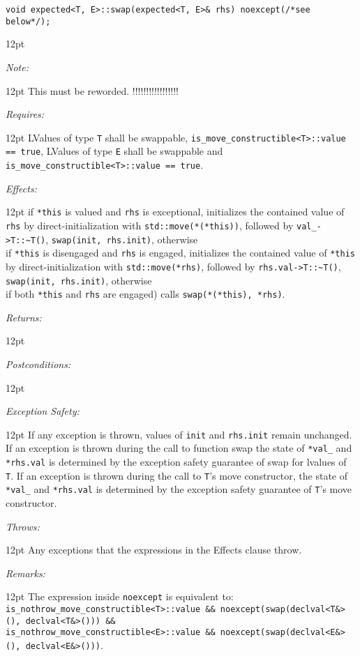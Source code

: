 \documentclass[a4paper,10pt]{article}
\newcommand{\cpp}[1]{\lstinline{#1}}
\newcommand{\wordingItem}[1]{\noindent\textit{#1:}}
\newenvironment{wordingTextItem}[1]{\wordingItem{#1}\vspace{7pt}\noindent\begin{adjustwidth}{12pt}{}}{\vspace{7pt}\end{adjustwidth}}
\newenvironment{wordingPara}{\begin{adjustwidth}{12pt}{}}{\end{adjustwidth}}
\begin{document}
\begin{lstlisting}[xleftmargin=0pt]
void expected<T, E>::swap(expected<T, E>& rhs) noexcept(/*see below*/); 
\end{lstlisting}
\begin{wordingPara}

\begin{wordingTextItem}{Note}
This must be reworded. !!!!!!!!!!!!!!!!!
\end{wordingTextItem}

\begin{wordingTextItem}{Requires}
LValues of type \cpp{T} shall be swappable, \cpp{is_move_constructible<T>::value == true}, LValues of type \cpp{E} shall be swappable and \cpp{is_move_constructible<T>::value == true}.
\end{wordingTextItem}
\begin{wordingTextItem}{Effects}
if \cpp{*this} is valued and \cpp{rhs} is exceptional, initializes the contained value of \cpp{rhs} by direct-initialization with \cpp{std::move(*(*this))}, followed by \cpp{val_->T::~T()}, \cpp{swap(init, rhs.init)}, otherwise \\
if \cpp{*this} is disengaged and \cpp{rhs} is engaged, initializes the contained value of \cpp{*this} by direct-initialization with \cpp{std::move(*rhs)}, followed by \cpp{rhs.val->T::~T()}, \cpp{swap(init, rhs.init)}, otherwise \\
if both \cpp{*this} and \cpp{rhs} are engaged) calls \cpp{swap(*(*this), *rhs)}. 
\end{wordingTextItem}
\begin{wordingTextItem}{Returns}
\end{wordingTextItem}
\begin{wordingTextItem}{Postconditions}
\end{wordingTextItem}
\begin{wordingTextItem}{Exception Safety}
If any exception is thrown, values of \cpp{init} and \cpp{rhs.init} remain unchanged. If an exception is thrown during the call to function swap the state of \cpp{*val_} and \cpp{*rhs.val} is determined by the exception safety guarantee of swap for lvalues of \cpp{T}. If an exception is thrown during the call to \cpp{T}'s move constructor, the state of \cpp{*val_} and \cpp{*rhs.val} is determined by the exception safety guarantee of \cpp{T}'s move constructor.
\end{wordingTextItem}
\begin{wordingTextItem}{Throws}
Any exceptions that the expressions in the Effects clause throw.
\end{wordingTextItem}
\begin{wordingTextItem}{Remarks}
The expression inside \cpp{noexcept} is equivalent to: \\
\cpp{is_nothrow_move_constructible<T>::value && noexcept(swap(declval<T&>(), declval<T&>())) &&} \\
\cpp{is_nothrow_move_constructible<E>::value && noexcept(swap(declval<E&>(), declval<E&>()))}.
\end{wordingTextItem}
\end{wordingPara}
\end{document}

